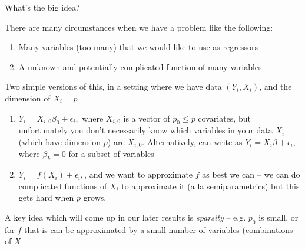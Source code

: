 \documentclass[notes,11pt, aspectratio=169]{beamer}
\newenvironment{wideitemize}{\itemize\addtolength{\itemsep}{10pt}}{\enditemize}
\begin{document}
\begin{frame}{What's the big idea?}
  \begin{wideitemize}
  \item There are many circumstances when we have a problem like the following:
    \begin{enumerate}
    \item Many variables (too many) that we would like to use as regressors
    \item A unknown and potentially complicated function of many variables
    \end{enumerate}
  \item Two simple versions of this, in a setting where we have data
    $(Y_{i}, X_{i})$, and the dimension of $X_{i}=p$
    \begin{enumerate}
    \item $Y_{i} = X_{i,0}\beta_{0} + \epsilon_{i},$ where $X_{i,0}$ is a
      vector of $p_{0} \leq p$ covariates, but unfortunately you don't
      necessarily know which variables in your data $X_{i}$ (which
      have dimension $p$) are $X_{i,0}$. Alternatively, can write as
      $Y_{i} = X_{i}\beta + \epsilon_{i}$, where $\beta_{k}=0$ for a
      subset of variables
    \item $Y_{i} = f(X_{i}) + \epsilon_{i},$, and we want to
      approximate $f$ as best we can -- we can do complicated
      functions of $X_{i}$ to approximate it (a la semiparametrics)
      but this gets hard when $p$ grows.
    \end{enumerate}
    \item A key idea which will come up in our later results is
      \emph{sparsity} -- e.g. $p_{0}$ is small, or for $f$ that is can
      be approximated by a small number of variables (combinations of
      $X$
  \end{wideitemize}
\end{frame}
\end{document}
